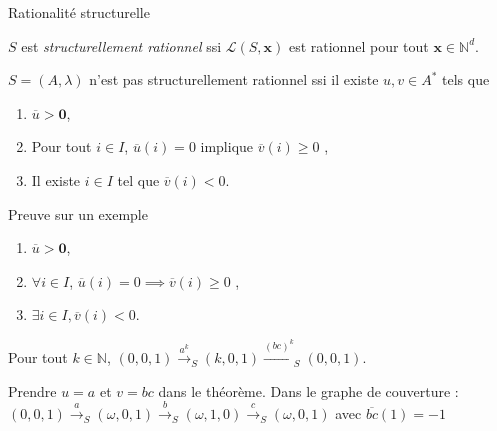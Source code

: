 \documentclass[french]{beamer}
\newcommand{\N}{\ensuremath{\mathbb{N}}}
\newcommand{\lang}{\ensuremath{\mathcal{L}}}
\newcommand{\trans}[2]{\ensuremath{\stackrel{#1}{\longrightarrow}_{#2}}}
\newcommand{\vect}[1]{\ensuremath{\mathbf{#1}}}
\newcommand{\xinit}{\ensuremath{\vect{x}_\text{init}}}
\newcommand{\valeur}[1]{\ensuremath{\overline{#1}}}
\let\oldemph\emph
\renewcommand{\emph}[1]{\oldemph{\color{blue}#1}}
\begin{document}

\begin{frame}{Rationalité structurelle}
\begin{definition}
$S$ est \emph{structurellement rationnel} ssi $\lang(S,\vect{x})$ est rationnel pour tout $\vect{x} \in \N^d$.
\end{definition}

\begin{theorem}
$S=(A,\lambda)$ n'est pas structurellement rationnel ssi il existe $u,v\in A^*$ tels que 
\begin{enumerate}
    \item $\valeur{u} > \vect{0}$,
    \item Pour tout $i \in I$, $\valeur{u}(i)=0$ implique $\valeur{v}(i) \geq 0$ ,
    \item Il existe $i\in I$ tel que $\valeur{v}(i) < 0$.
\end{enumerate}
\end{theorem}
    
\end{frame}

\begin{frame}{Preuve sur un exemple}
\begin{theorem}[rappel]
\begin{enumerate}
    \item $\valeur{u} > \vect{0}$,
    \item $\forall i \in I$, $\valeur{u}(i)=0 \implies \valeur{v}(i) \geq 0$ ,
    \item $\exists i\in I, \valeur{v}(i) < 0$.
\end{enumerate}
\end{theorem}

\begin{example}
Pour tout $k\in\N$, $(0,0,1) \trans{a^k}{S} (k,0,1) \trans{(bc)^k}{S} (0,0,1)$.

\vspace{2mm}
Prendre $u=a$ et $v=bc$ dans le théorème.
Dans le graphe de couverture :
$(0,0,1) \trans{a}{S} (\omega,0,1) \trans{b}{S} (\omega,1,0) \trans{c}{S} (\omega,0,1)$
avec $\valeur{bc}(1)= -1$
\end{example}

\end{frame}
\end{document}
